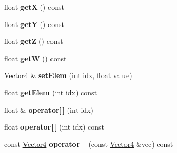 \begin{DoxyCompactItemize}
\item 
\hypertarget{class_vectormath_1_1_aos_1_1_vector4_a5d7755096d3effdb3ff1b40de3d3c2c7}{float {\bfseries get\+X} () const }\label{class_vectormath_1_1_aos_1_1_vector4_a5d7755096d3effdb3ff1b40de3d3c2c7}

\item 
\hypertarget{class_vectormath_1_1_aos_1_1_vector4_a21243d46a7aca7adf8712de7e38b8038}{float {\bfseries get\+Y} () const }\label{class_vectormath_1_1_aos_1_1_vector4_a21243d46a7aca7adf8712de7e38b8038}

\item 
\hypertarget{class_vectormath_1_1_aos_1_1_vector4_af3933a9f35bea02020e5d5398c29dcb9}{float {\bfseries get\+Z} () const }\label{class_vectormath_1_1_aos_1_1_vector4_af3933a9f35bea02020e5d5398c29dcb9}

\item 
\hypertarget{class_vectormath_1_1_aos_1_1_vector4_a59f1a667c2299b3e7fffc36c1b84c604}{float {\bfseries get\+W} () const }\label{class_vectormath_1_1_aos_1_1_vector4_a59f1a667c2299b3e7fffc36c1b84c604}

\item 
\hypertarget{class_vectormath_1_1_aos_1_1_vector4_a276e3e1533678028233cb3d3c28e8614}{\hyperlink{class_vectormath_1_1_aos_1_1_vector4}{Vector4} \& {\bfseries set\+Elem} (int idx, float value)}\label{class_vectormath_1_1_aos_1_1_vector4_a276e3e1533678028233cb3d3c28e8614}

\item 
\hypertarget{class_vectormath_1_1_aos_1_1_vector4_a5ed10c85848003bbaa7dfdb9046aee17}{float {\bfseries get\+Elem} (int idx) const }\label{class_vectormath_1_1_aos_1_1_vector4_a5ed10c85848003bbaa7dfdb9046aee17}

\item 
\hypertarget{class_vectormath_1_1_aos_1_1_vector4_af17b2f536750a2cbbef96c855ef43eda}{float \& {\bfseries operator\mbox{[}$\,$\mbox{]}} (int idx)}\label{class_vectormath_1_1_aos_1_1_vector4_af17b2f536750a2cbbef96c855ef43eda}

\item 
\hypertarget{class_vectormath_1_1_aos_1_1_vector4_a54e18cdf3dc7b9669515bb50e79ef64e}{float {\bfseries operator\mbox{[}$\,$\mbox{]}} (int idx) const }\label{class_vectormath_1_1_aos_1_1_vector4_a54e18cdf3dc7b9669515bb50e79ef64e}

\item 
\hypertarget{class_vectormath_1_1_aos_1_1_vector4_aa0d158f2b9aea109ccee3fa5465ac7e7}{const \hyperlink{class_vectormath_1_1_aos_1_1_vector4}{Vector4} {\bfseries operator+} (const \hyperlink{class_vectormath_1_1_aos_1_1_vector4}{Vector4} \&vec) const }\label{class_vectormath_1_1_aos_1_1_vector4_aa0d158f2b9aea109ccee3fa5465ac7e7}


\end{DoxyCompactItemize}
